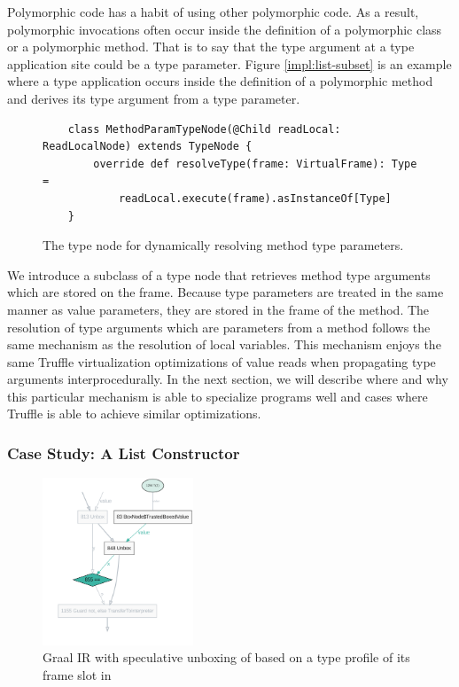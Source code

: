 Polymorphic code has a habit of using other polymorphic code.
As a result, polymorphic invocations often occur inside the definition of a polymorphic class or a polymorphic method.
That is to say that the type argument at a type application site could be a type parameter.
Figure \ref{impl:list-subset} is an example where a type application occurs inside the definition of a polymorphic method and derives its type argument from a type parameter.

\begin{figure}[!htb]
	\begin{verbatim}
	class MethodParamTypeNode(@Child readLocal: ReadLocalNode) extends TypeNode {
		override def resolveType(frame: VirtualFrame): Type = 
			readLocal.execute(frame).asInstanceOf[Type]
	}
	\end{verbatim}
	\caption{The type node for dynamically resolving method type parameters.}
	\label{impl:method-param-typenode}
\end{figure}

We introduce a subclass of a type node that retrieves method type arguments which are stored on the frame.
Because type parameters are treated in the same manner as value parameters, they are stored in the frame of the method.
The resolution of type arguments which are parameters from a method follows the same mechanism as the resolution of local variables.
This mechanism enjoys the same Truffle virtualization optimizations of value reads when propagating type arguments interprocedurally.
In the next section, we will describe where and why this particular mechanism is able to specialize programs well and cases where Truffle is able to achieve similar optimizations.

\subsubsection*{Case Study: A List Constructor}

\begin{figure}[!htb]
	\centering
	\includegraphics[width=0.4\textwidth]{figures/dot/List.contains.boxed-param-read.TruffleTier.png}
	\caption{Graal IR with speculative unboxing of  based on a type profile of its frame slot in }
	\label{graalir:cons-contains-param-read}
\end{figure}

